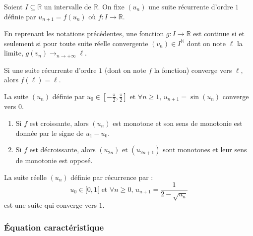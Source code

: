 
  Soient $I \subseteq \mathbb{R}$ un intervalle de $\mathbb{R}$. On fixe $(u_n)$ une suite récurrente d'ordre $1$ définie par $u_{n+1} = f(u_n)$ où $f : I \rightarrow \mathbb{R}$.

  \begin{theorem}
    En reprenant les notations précédentes, une fonction $g : I \rightarrow \mathbb{R}$ est continue si et seulement si pour toute suite réelle convergente $(v_n) \in I^{\mathbb{N}}$ dont on note $\ell$ la limite, $g(v_n) \longrightarrow_{n \rightarrow +\infty} \ell$.
  \end{theorem}

  \begin{corollary}
    Si une suite récurrente d'ordre $1$ (dont on note $f$ la fonction) converge vers $\ell$, alors $f(\ell) = \ell$.
  \end{corollary}

  \begin{example}
    La suite $(u_n)$ définie par $u_0 \in \left[ -\frac{\pi}{2}, \frac{\pi}{2} \right]$ et $\forall n \geq 1, \, u_{n+1} = \sin(u_n)$ converge vers $0$.
  \end{example}


  \begin{proposition}
    \begin{enumerate}[label=(\roman*)]
      \item Si $f$ est croissante, alors $(u_n)$ est monotone et son sens de monotonie est donnée par le signe de $u_1 - u_0$.
      \item Si $f$ est décroissante, alors $(u_{2n})$ et $(u_{2n+1})$ sont monotones et leur sens de monotonie est opposé.
    \end{enumerate}
  \end{proposition}

  \begin{example}
    La suite réelle $(u_n)$ définie par récurrence par :
    \[ u_0 \in [0, 1[ \text{ et } \forall n \geq 0, \, u_{n+1} = \frac{1}{2 - \sqrt{u_n}} \]
    est une suite qui converge vers $1$.
  \end{example}

  \subsubsection{Équation caractéristique}

